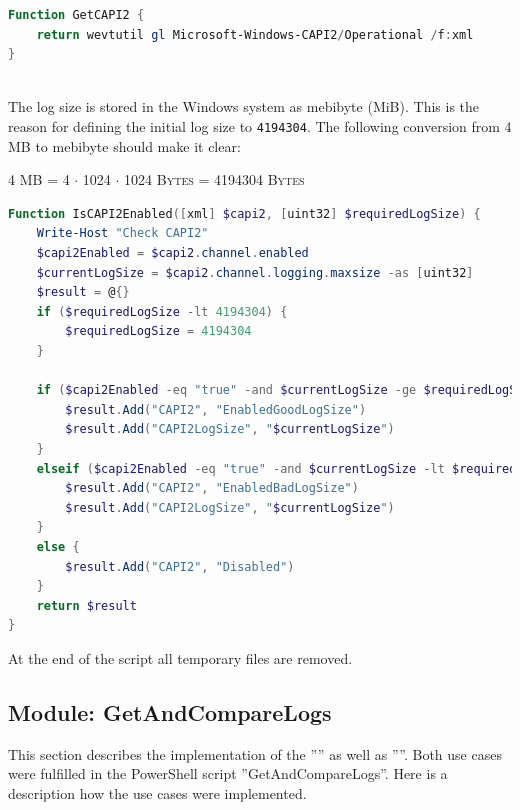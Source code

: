 \begin{lstlisting}[caption=Function GetCAPI2, language=PowerShell]
Function GetCAPI2 {
    return wevtutil gl Microsoft-Windows-CAPI2/Operational /f:xml
}
\end{lstlisting}\ \\
The log size is stored in the Windows system as mebibyte (MiB). This is the reason for defining the initial log size to \lstinline|4194304|. The following conversion from 4 MB to mebibyte should make it clear:
\begin{center}
    \textsc{4 MB = 4 $\cdot$ 1024 $\cdot$ 1024 Bytes = 4194304 Bytes }
\end{center}
\begin{lstlisting}[caption=Function IsCAPI2Enabled, language=PowerShell]
Function IsCAPI2Enabled([xml] $capi2, [uint32] $requiredLogSize) {
    Write-Host "Check CAPI2"
    $capi2Enabled = $capi2.channel.enabled
    $currentLogSize = $capi2.channel.logging.maxsize -as [uint32]
    $result = @{}
    if ($requiredLogSize -lt 4194304) {
        $requiredLogSize = 4194304
    }

    if ($capi2Enabled -eq "true" -and $currentLogSize -ge $requiredLogSize) {
        $result.Add("CAPI2", "EnabledGoodLogSize")
        $result.Add("CAPI2LogSize", "$currentLogSize")
    }
    elseif ($capi2Enabled -eq "true" -and $currentLogSize -lt $requiredLogSize) {
        $result.Add("CAPI2", "EnabledBadLogSize")
        $result.Add("CAPI2LogSize", "$currentLogSize")
    }
    else {
        $result.Add("CAPI2", "Disabled")
    }
    return $result
}  
\end{lstlisting}
At the end of the script all temporary files are removed.
\clearpage

\subsection{Module: GetAndCompareLogs}
This section describes the implementation of the '''' as well as ''''. Both use cases were fulfilled in the PowerShell script ''GetAndCompareLogs''. Here is a description how the use cases were implemented.


